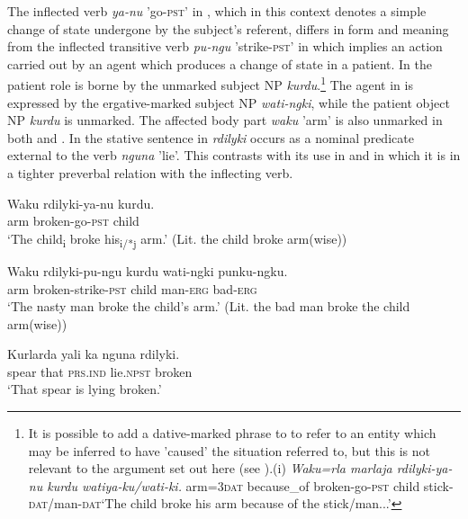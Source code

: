 \documentclass[output=paper]{../langscibook}
\begin{document}
The inflected verb \textit{ya-nu} 'go-\textsc{pst'} in , which in this context denotes a simple change of state undergone by the subject's referent, differs in form and meaning from the inflected transitive verb \textit{pu-ngu} {}'strike-\textsc{pst'} in  which implies an action carried out by an agent which produces a change of state in a patient. In  the patient role is borne by the unmarked subject NP \textit{kurdu}.\footnote{It is possible to add a dative-marked phrase to  to refer to an entity which may be inferred to have 'caused' the situation referred to, but this is not relevant to the argument set out here (see \citet[386-8]{Simpson1991}).(i)   \textit{Waku=rla   marlaja   rdilyki-ya-nu   kurdu   watiya-ku/wati-ki.}  arm=\textsc{3dat}   because\_of   broken-go-\textsc{pst}   child   stick-\textsc{dat}/man-\textsc{dat}\glt `The child broke his arm because of the stick/man...'} The agent in  is expressed by the ergative-marked subject NP \textit{wati-ngki}, while the patient object NP \textit{kurdu} is unmarked. The affected body part \textit{waku} 'arm' is also unmarked in both  and . In the stative sentence in  \textit{rdilyki} occurs as a nominal predicate external to the verb \textit{nguna} 'lie'. This contrasts with its use in  and  in which it is in a tighter preverbal relation with the inflecting verb.

\ea%
    \label{ex:laughren:20}
\ea
\label{ex:laughren:20a}
\gll  Waku   rdilyki-ya-nu  kurdu.\\
    arm  broken-go-\textsc{pst}  child\\
  \glt `The child\textsubscript{i} broke his\textsubscript{i/*j} arm.' (Lit. the child broke arm(wise))

\ex
\label{ex:laughren:20b}
\gll  Waku  rdilyki-pu-ngu  kurdu  wati-ngki  punku-ngku.\\
    arm  broken-strike-\textsc{pst}  child  man-\textsc{erg}  bad-\textsc{erg}\\
  \glt `The nasty man broke the child's arm.' (Lit. the bad man broke the child arm(wise))

\ex
\label{ex:laughren:20c}
\gll  Kurlarda  yali  ka  nguna  rdilyki.\\
    spear  that  \textsc{prs.ind}  lie.\textsc{npst}  broken\\
\glt `That spear is lying broken.'
\z
\z
\end{document}
